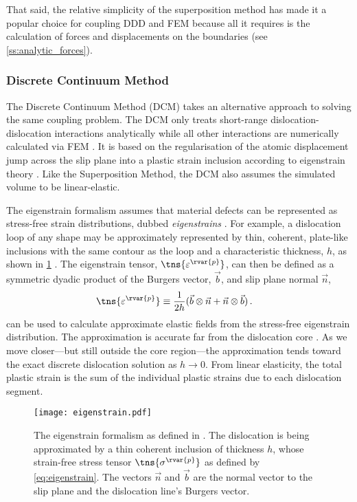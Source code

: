 That said, the relative simplicity of the superposition method has made it a popular choice \cite{analytic_tractions, ddd_fem_sm, ddd_fem_sm2} for coupling DDD and FEM because all it requires is the calculation of forces and displacements on the boundaries (see \cref{ss:analytic_forces}).

\subsubsection{Discrete Continuum Method}
\label{sss:discrete_continuum}

The Discrete Continuum Method (DCM) takes an alternative approach to solving the same coupling problem. The DCM only treats short-range dislocation-dislocation interactions analytically while all other interactions are numerically calculated via FEM \cite{dcm}. It is based on the regularisation of the atomic displacement jump across the slip plane into a plastic strain inclusion according to eigenstrain theory \cite{eigenstrain}. Like the Superposition Method, the DCM also assumes the simulated volume to be linear-elastic.

The eigenstrain formalism assumes that material defects can be represented as stress-free strain distributions, dubbed \emph{eigenstrains} \cite{eigenstrain}. For example, a dislocation loop of any shape may be approximately represented by thin, coherent, plate-like inclusions with the same contour as the loop and a characteristic thickness, $ h $, as shown in \cref{f:eigenstrain} \cite{dcm}. The eigenstrain tensor, $ \tns{\varepsilon^{\rvar{p}}} $, can then be defined as a symmetric dyadic product of the Burgers vector, $ \vec{b} $, and slip plane normal $ \vec{n} $,
\begin{align}\label{eq:eigenstrain}
    \tns{\varepsilon^{\rvar{p}}} & \equiv \dfrac{1}{2h} (\vec{b} \otimes \vec{n} + \vec{n} \otimes \vec{b})\,.
\end{align}
 can be used to calculate approximate elastic fields from the stress-free eigenstrain distribution. The approximation is accurate far from the dislocation core \cite{dln_core}. As we move closer---but still outside the core region---the approximation tends toward the exact discrete dislocation solution as $ h \to 0$. From linear elasticity, the total plastic strain is the sum of the individual plastic strains due to each dislocation segment.
\begin{figure}
    \centering
    \texttt{[image: eigenstrain.pdf]}
    \caption[The eigenstrain formalism.]{The eigenstrain formalism as defined in \cite{eigenstrain}. The dislocation is being approximated by a thin coherent inclusion of thickness $ h $, whose strain-free stress tensor $ \tns{\sigma^{\rvar{p}}} $ as defined by \cref{eq:eigenstrain}. The vectors $ \vec{n} $ and $ \vec{b} $ are the normal vector to the slip plane and the dislocation line's Burgers vector.}
    \label{f:eigenstrain}
\end{figure}

